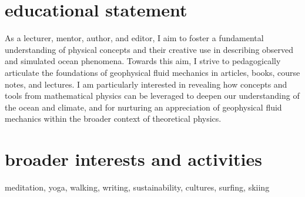 \documentclass{article}
\begin{document}
\section*{\sc \color{Maroon} educational statement}
\vspace{-.3cm}
As a lecturer, mentor, author, and editor, I aim to foster a fundamental understanding of physical concepts and their creative use in describing observed and simulated ocean phenomena. Towards this aim, I strive to pedagogically articulate the foundations of geophysical fluid mechanics in articles, books, course notes, and lectures.  I am particularly interested in revealing how concepts and tools from mathematical physics can be leveraged to deepen our understanding of the ocean and climate, and for nurturing an appreciation of geophysical fluid mechanics within the broader context of theoretical physics. 

\section*{\sc  \color{Maroon}  broader interests and activities}
\vspace{-.25cm}

meditation, yoga, walking, writing, sustainability, cultures, surfing, skiing
\end{document}
